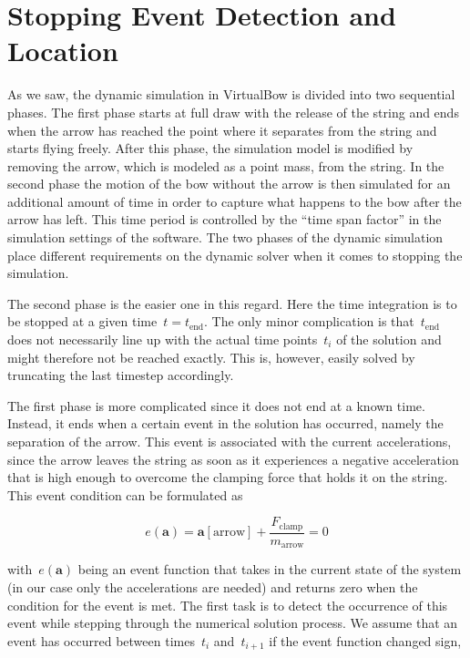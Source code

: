 \section{Stopping Event Detection and Location}

As we saw, the dynamic simulation in VirtualBow is divided into two sequential phases.
The first phase starts at full draw with the release of the string and ends when the arrow has reached the point where it separates from the string and starts flying freely.
After this phase, the simulation model is modified by removing the arrow, which is modeled as a point mass, from the string.
In the second phase the motion of the bow without the arrow is then simulated for an additional amount of time in order to capture what happens to the bow after the arrow has left.
This time period is controlled by the ``time span factor'' in the simulation settings of the software.
The two phases of the dynamic simulation place different requirements on the dynamic solver when it comes to stopping the simulation.

The second phase is the easier one in this regard.
Here the time integration is to be stopped at a given time~$t = t_\mathrm{end}$.
The only minor complication is that~$t_\mathrm{end}$ does not necessarily line up with the actual time points~$t_{i}$ of the solution and might therefore not be reached exactly.
This is, however, easily solved by truncating the last timestep accordingly.

The first phase is more complicated since it does not end at a known time.
Instead, it ends when a certain event in the solution has occurred, namely the separation of the arrow.
This event is associated with the current accelerations, since the arrow leaves the string as soon as it experiences a negative acceleration that is high enough to overcome the clamping force that holds it on the string.
This event condition can be formulated as

\begin{equation}
e(\boldsymbol{a}) = \boldsymbol{a}[\mathrm{arrow}] + \frac{F_{\mathrm{clamp}}}{m_{\mathrm{arrow}}} = 0 \label{eq:event-function-arrow}
\end{equation}

with~$e(\boldsymbol{a})$ being an event function that takes in the current state of the system (in our case only the accelerations are needed) and returns zero when the condition for the event is met.
The first task is to detect the occurrence of this event while stepping through the numerical solution process.
We assume that an event has occurred between times~$t_{i}$ and~$t_{i+1}$ if the event function changed sign,

